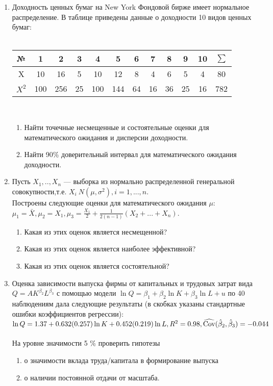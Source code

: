 \documentclass[pdftex,12pt,a4paper]{article}
\begin{document}
\begin{enumerate}
\begin{enumerate}
\end{enumerate}
\item Доходность ценных бумаг на New York Фондовой бирже имеет нормальное распределение. В таблице приведены данные о доходности 10 видов ценных бумаг:\\ \\
\begin{tabular}{c|ccccccccccc}
  № & 1 & 2 & 3 & 4 & 5 & 6 & 7 & 8 & 9 & 10 & $\sum$ \\
  \hline
  X & 10 & 16 & 5 & 10 & 12 & 8 & 4 & 6 & 5 & 4 & 80 \\
  $X^2$ & 100 & 256 & 25 & 100 & 144 & 64 & 16 & 36 & 25 & 16 & 782\\
\end{tabular} \\

\begin{enumerate}
\item Найти точечные несмещенные и состоятельные оценки для математического ожидания и дисперсии доходности.
\item Найти 90\% доверительный интервал для математического ожидания доходности.
\end{enumerate}
\item Пусть $X_1,..,X_n$ --- выборка из нормально распределенной генеральной совокупности,т.е. $X_i~N(\mu,\sigma^2), i=1,...,n.$\\
Построены следующие оценки для математического ожидания $\mu$:\\
$\mu_1=\bar{X}, \mu_2=X_1, \mu_3=\frac{X_1}{2}+\frac{1}{2(n-1)}(X_2+...+X_n)$.
\begin{enumerate}
\item Какая из этих оценок является несмещенной?
\item Какая из этих оценок является наиболее эффективной?
\item Какая из этих оценок является состоятельной?
\end{enumerate}

\item Оценка зависимости выпуска фирмы от капитальных и трудовых затрат вида $Q=AK^{\beta_2}L^{\beta_3}$ с помощью модели $\ln Q=\beta_1+\beta_2\ln K+\beta_3\ln L+u$ по 40 наблюдениям дала следующие результаты (в скобках указаны стандартные ошибки коэффициентов регрессии):\\
$\ln Q=1.37+0.632 (0.257)\ln K+0.452(0.219)\ln L, R^2=0.98, \widehat{\operatorname{Cov}}(\hat{\beta}_2,\hat{\beta}_3)=-0.044$\\
\\На уровне значимости 5 \% проверить гипотезы
\begin{enumerate}
\item о значимости вклада труда/капитала в формирование выпуска
\item о наличии постоянной отдачи от масштаба.
\end{enumerate}

\end{enumerate}
\end{document}
